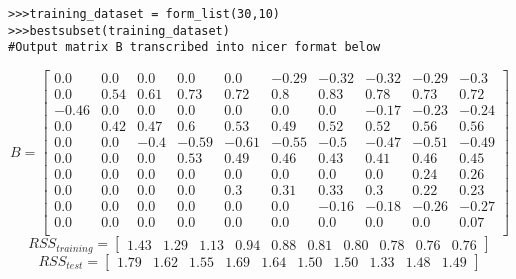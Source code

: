 \documentclass{article}
\begin{document}
\begin{lstlisting}
>>>training_dataset = form_list(30,10) 
>>>bestsubset(training_dataset)
#Output matrix B transcribed into nicer format below
\end{lstlisting}
\begin{equation*}
B= 
\begin{bmatrix}
0.0 & 0.0 & 0.0 & 0.0 & 0.0 & -0.29 & -0.32 & -0.32 & -0.29 & -0.3 \\
0.0 & 0.54 & 0.61 & 0.73 & 0.72 & 0.8 & 0.83 & 0.78 & 0.73 & 0.72 \\
-0.46 & 0.0 & 0.0 & 0.0 & 0.0 & 0.0 & 0.0 & -0.17 & -0.23 & -0.24 \\
0.0 & 0.42 & 0.47 & 0.6 & 0.53 & 0.49 & 0.52 & 0.52 & 0.56 & 0.56 \\ 
0.0 & 0.0 & -0.4 & -0.59 & -0.61 & -0.55 & -0.5 & -0.47 & -0.51 & -0.49 \\ 
0.0 & 0.0 & 0.0 & 0.53 & 0.49 & 0.46 & 0.43 & 0.41 & 0.46 & 0.45 \\
0.0 & 0.0 & 0.0 & 0.0 & 0.0 & 0.0 & 0.0 & 0.0 & 0.24 & 0.26 \\
0.0 & 0.0 & 0.0 & 0.0 & 0.3 & 0.31 & 0.33 & 0.3 & 0.22 & 0.23 \\ 
0.0 & 0.0 & 0.0 & 0.0 & 0.0 & 0.0 & -0.16 & -0.18 & -0.26 & -0.27 \\ 
0.0 & 0.0 & 0.0 & 0.0 & 0.0 & 0.0 & 0.0 & 0.0 & 0.0 & 0.07 \\
\end{bmatrix} 
\end{equation*}
\begin{equation*}
RSS_{training} = 
\begin{bmatrix}
1.43 & 1.29 & 1.13 & 0.94 & 0.88 & 0.81 & 0.80 & 0.78 & 0.76 & 0.76
\end{bmatrix} 
\end{equation*}
\begin{equation*}
RSS_{test} = 
\begin{bmatrix}
1.79 & 1.62 & 1.55 & 1.69 & 1.64 & 1.50 & 1.50 & 1.33 & 1.48 & 1.49
\end{bmatrix} 
\end{equation*}
\end{document}
